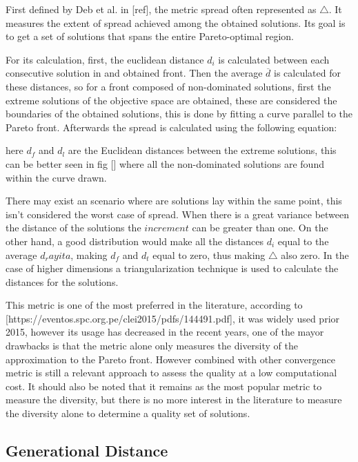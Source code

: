First defined by Deb et al. in [ref], the metric spread often represented as $\bigtriangleup$. It measures the extent of spread achieved among the obtained solutions. Its goal is to get a set of solutions that spans the entire Pareto-optimal region.

For its calculation, first, the euclidean distance $d_i$ is calculated between each consecutive solution in and obtained front. Then the average $\overline{d}$ is calculated for these distances, so for a front composed of non-dominated solutions, first the extreme solutions of the objective space are obtained, these are considered the boundaries of the obtained solutions, this is done by fitting a curve parallel to the Pareto front. Afterwards the spread is calculated using the following equation: 


here $d_f$ and $d_l$ are the Euclidean distances between the extreme solutions, this can be better seen in fig [] where all the non-dominated solutions are found within the curve drawn.


There may exist an scenario where are solutions lay within the same point, this isn't considered the worst case of spread. When there is a great variance between the distance of the solutions the $increment$ can be greater than one. On the other hand, a good distribution would make all the distances $d_i$ equal to the average $d_rayita$, making $d_f$ and $d_t$ equal to zero, thus making $\bigtriangleup$ also zero. In the case of higher dimensions a triangularization technique is used to calculate the distances for the solutions.

This metric is one of the most preferred in the literature, according to [https://eventos.spc.org.pe/clei2015/pdfs/144491.pdf], it was widely used prior 2015, however its usage has decreased in the recent years, one of the mayor drawbacks is that the metric alone only measures the diversity of the approximation to the Pareto front. However combined with other convergence metric is still a relevant approach to assess the quality at a low computational cost. It should also be noted that it remains as the most popular metric to measure the diversity, but there is no more interest in the literature to measure the diversity alone to determine a quality set of solutions.

\subsection{Generational Distance}

